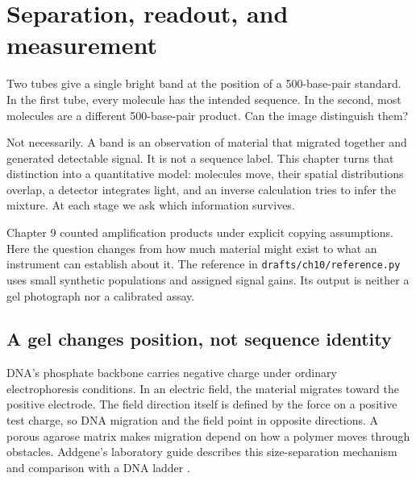 \chapter{Separation, readout, and measurement}
\label{ch:readout}

Two tubes give a single bright band at the position of a 500-base-pair standard. In the first tube, every molecule has the intended sequence. In the second, most molecules are a different 500-base-pair product. Can the image distinguish them?

Not necessarily. A band is an observation of material that migrated together and generated detectable signal. It is not a sequence label. This chapter turns that distinction into a quantitative model: molecules move, their spatial distributions overlap, a detector integrates light, and an inverse calculation tries to infer the mixture. At each stage we ask which information survives.

Chapter 9 counted amplification products under explicit copying assumptions. Here the question changes from how much material might exist to what an instrument can establish about it. The reference in \texttt{drafts/ch10/reference.py} uses small synthetic populations and assigned signal gains. Its output is neither a gel photograph nor a calibrated assay.

\section{A gel changes position, not sequence identity}
DNA's phosphate backbone carries negative charge under ordinary electrophoresis conditions. In an electric field, the material migrates toward the positive electrode. The field direction itself is defined by the force on a positive test charge, so DNA migration and the field point in opposite directions. A porous agarose matrix makes migration depend on how a polymer moves through obstacles. Addgene's laboratory guide describes this size-separation mechanism and comparison with a DNA ladder \cite{addgene}.


